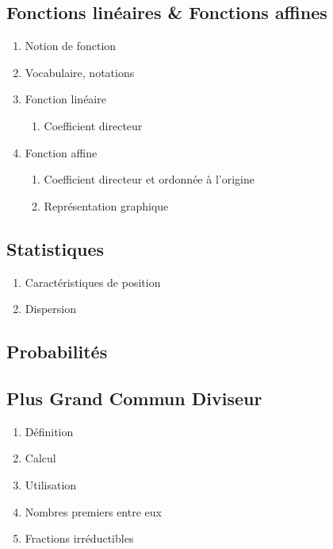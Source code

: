 \subsection{Fonctions linéaires \& Fonctions affines}\label{ch_3_fonct}

\begin{enumerate}
	\item Notion de fonction
	\item Vocabulaire, notations
	\item Fonction linéaire
	\begin{enumerate}
		\item Coefficient directeur
	\end{enumerate}
	\item Fonction affine
	\begin{enumerate}
		\item Coefficient directeur et ordonnée à l'origine
		\item Représentation graphique 
	\end{enumerate}
\end{enumerate}

\subsection{Statistiques}\label{ch_3_stats}

\begin{enumerate}
	\item Caractéristiques de position
	\item Dispersion
\end{enumerate}

\subsection{Probabilités}\label{ch_3_proba}

\subsection{Plus Grand Commun Diviseur}\label{ch_3_pgcd}

\begin{enumerate}
	\item Définition
	\item Calcul
	\item Utilisation
	\item Nombres premiers entre eux
	\item Fractions irréductibles
\end{enumerate}

